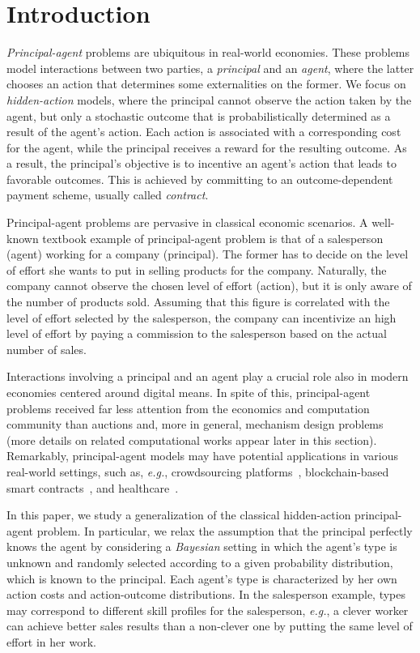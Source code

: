 \section{Introduction}\label{sec:introduction}


\emph{Principal-agent} problems are ubiquitous in real-world economies.
%
These problems model interactions between two parties, a \emph{principal} and an \emph{agent}, where the latter chooses an action that determines some externalities on the former.
%
We focus on \emph{hidden-action} models, where the principal cannot observe the action taken by the agent, but only a stochastic outcome that is probabilistically determined as a result of the agent's action.
%
Each action is associated with a corresponding cost for the agent, while the principal receives a reward for the resulting outcome.
%
As a result, the principal's objective is to incentive an agent's action that leads to favorable outcomes.
%
This is achieved by committing to an outcome-dependent payment scheme, usually called \emph{contract}.


Principal-agent problems are pervasive in classical economic scenarios.
%
A well-known textbook example of principal-agent problem is that of a salesperson (agent) working for a company (principal).
%
The former has to decide on the level of effort she wants to put in selling products for the company.
%
Naturally, the company cannot observe the chosen level of effort (action), but it is only aware of the number of products sold.
%
Assuming that this figure is correlated with the level of effort selected by the salesperson, the company can incentivize an high level of effort by paying a commission to the salesperson based on the actual number of sales.


Interactions involving a principal and an agent play a crucial role also in modern economies centered around digital means.
%
In spite of this, principal-agent problems received far less attention from the economics and computation community than auctions and, more in general, mechanism design problems (more details on related computational works appear later in this section).
%
Remarkably, principal-agent models may have potential applications in various real-world settings, such as, \emph{e.g.}, crowdsourcing platforms~\citep{ho2016adaptive}, blockchain-based smart contracts~\citep{cong2019blockchain}, and healthcare~\citep{bastani2016analysis}.


In this paper, we study a generalization of the classical hidden-action principal-agent problem.
%
In particular, we relax the assumption that the principal perfectly knows the agent by considering a \emph{Bayesian} setting in which the agent's type is unknown and randomly selected according to a given probability distribution, which is known to the principal.
%
Each agent's type is characterized by her own action costs and action-outcome distributions.
%
In the salesperson example, types may correspond to different skill profiles for the salesperson, \emph{e.g.}, a clever worker can achieve better sales results than a non-clever one by putting the same level of effort in her work.


